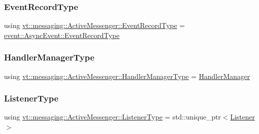 \subsubsection{\texorpdfstring{Event\+Record\+Type}{EventRecordType}}
{\footnotesize\ttfamily using \hyperlink{structvt_1_1messaging_1_1_active_messenger_aed736a2b2eaa0f96971a4f0be3fe0a25}{vt\+::messaging\+::\+Active\+Messenger\+::\+Event\+Record\+Type} =  \hyperlink{structvt_1_1event_1_1_async_event_a5b4ef37db6e5962fdc0e6e0e56e74bc1}{event\+::\+Async\+Event\+::\+Event\+Record\+Type}}

\mbox{\label{structvt_1_1messaging_1_1_active_messenger_ac7e9165df6550ea333f8eb018a5a0e60}} 
\subsubsection{\texorpdfstring{Handler\+Manager\+Type}{HandlerManagerType}}
{\footnotesize\ttfamily using \hyperlink{structvt_1_1messaging_1_1_active_messenger_ac7e9165df6550ea333f8eb018a5a0e60}{vt\+::messaging\+::\+Active\+Messenger\+::\+Handler\+Manager\+Type} =  \hyperlink{structvt_1_1_handler_manager}{Handler\+Manager}}

\mbox{\label{structvt_1_1messaging_1_1_active_messenger_a63878fd4ef1fbc505bd1313d32049ca9}} 
\subsubsection{\texorpdfstring{Listener\+Type}{ListenerType}}
{\footnotesize\ttfamily using \hyperlink{structvt_1_1messaging_1_1_active_messenger_a63878fd4ef1fbc505bd1313d32049ca9}{vt\+::messaging\+::\+Active\+Messenger\+::\+Listener\+Type} =  std\+::unique\+\_\+ptr$<$\hyperlink{structvt_1_1messaging_1_1_listener}{Listener}$>$}

\mbox{\label{structvt_1_1messaging_1_1_active_messenger_a745d5e8cad8c2f67d20479afacc6e134}} 
